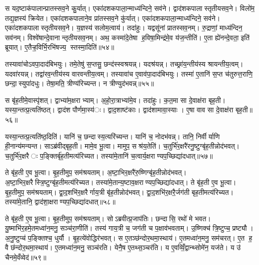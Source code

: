 स यद॒ष्टाक॑पालान्प्रातस्सव॒ने कु॒र्यात्। एका॑दशकपाला॒न्माध्य॑न्दिने॒ सव॑ने। द्वाद॑शकपालास्तृतीयसव॒ने। विलो॑म॒ तद्य॒ज्ञस्य॑ क्रियेत। एका॑दशकपालाने॒व प्रा॑तस्सव॒ने कु॑र्यात्। एका॑दशकपाला॒न्माध्य॑न्दिने॒ सव॑ने। एका॑दशकपालास्तृतीयसव॒ने। य॒ज्ञस्य॑ सलोम॒त्वाय॑। तदा॑हुः। यद्वसू॑नां प्रातस्सव॒नम्। रु॒द्राणां॒ माध्य॑न्दिन॒ सव॑नम्। विश्वे॑षान्दे॒वानान्तृतीयसव॒नम्। अथ॒ कस्मा॑दे॒तेषा ह॒विषा॒मिन्द्र॑मे॒व य॑ज॒न्तीति॑। ए॒ता ह्ये॑नन्दे॒वता॒ इति॑ ब्रूयात्। ए॒तैऱ्ह॒विर्भि॒रभि॑षज्य॒ स्तस्मा॒दिति॑॥५४॥


तस्यावा॑चोऽवपा॒दाद॑बिभयुः। तमे॒तेषु॑ स॒प्तसु॒ छन्द॑स्स्वश्रयन्न्। यदश्र॑यन्न्। तच्छ्रा॑य॒न्तीय॑स्य श्रायन्तीय॒त्वम्। यदवा॑रयन्न्। तद्वा॑रव॒न्तीय॑स्य वारवन्तीय॒त्वम्। तस्यावा॑च ए॒वाव॑पा॒दाद॑बिभयुः। तस्मा॑ ए॒तानि॑ स॒प्त च॑तुरुत्त॒राणि॒ छन्दा॒स्युपा॑दधुः। तेषा॒मति॒ त्रीण्य॑रिच्यन्त। न त्रीण्युद॑भवन्न्॥५५॥

स बृ॑ह॒तीमे॒वास्पृ॑शत्। द्वाभ्या॑म॒क्षराभ्याम्। अ॒हो॒रा॒त्राभ्या॑मे॒व। तदा॑हुः। क॒त॒मा सा दे॒वाक्ष॑रा बृह॒ती। यस्या॒न्तत्प्र॒त्यति॑ष्ठत्। द्वाद॑श पौर्णमा॒स्य॑ः। द्वाद॒शाष्ट॑काः। द्वाद॑शामावा॒स्याः। ए॒षा वाव सा दे॒वाक्ष॑रा बृह॒ती॥५६॥

यस्या॒न्तत्प्र॒त्यति॑ष्ठ॒दिति॑। यानि॑ च॒ छन्दास्य॒त्यरि॑च्यन्त। यानि॑ च॒ नोदभ॑वन्न्। तानि॒ निर्वीर्याणि ही॒नान्य॑मन्यन्त। साऽब्र॑वीद्बृह॒ती। मामे॒व भू॒त्वा। मामुप॒ सश्र॑य॒तेति॑। च॒तुर्भि॑र॒क्षरै॑रनु॒ष्टुग्बृ॑ह॒तीन्नोद॑भवत्। च॒तुर्भि॑र॒क्षरैः प॒ङ्क्तिर्बृ॑ह॒तीमत्य॑रिच्यत। तस्या॑मे॒तानि॑ च॒त्वार्य॒क्षराण्यप॒च्छिद्या॑दधात्॥५७॥

ते बृ॑ह॒ती ए॒व भू॒त्वा। बृ॒ह॒तीमुप॒ सम॑श्रयताम्। अ॒ष्टा॒भिर॒क्षरै॑रु॒ष्णिग्बृ॑ह॒तीन्नोद॑भवत्। अ॒ष्टा॒भिर॒क्षरैस्त्रि॒ष्टुग्बृ॑ह॒तीमत्य॑रिच्यत। तस्या॑मे॒तान्य॒ष्टाव॒क्षराण्यप॒च्छिद्या॑दधात्। ते बृ॑ह॒ती ए॒व भू॒त्वा। बृ॒ह॒तीमुप॒ सम॑श्रयताम्। द्वा॒द॒शभि॑र॒क्षरैर्गाय॒त्री बृ॑ह॒तीन्नोद॑भवत्। द्वा॒द॒शभि॑र॒क्षरै॒र्जग॑ती बृह॒तीमत्य॑रिच्यत। तस्या॑मे॒तानि॒ द्वाद॑शा॒क्षराण्यप॒च्छिद्या॑दधात्॥५८॥

ते बृ॑ह॒ती ए॒व भू॒त्वा। बृ॒ह॒तीमुप॒ सम॑श्रयताम्। सोऽब्रवीत्प्र॒जाप॑तिः। छन्दासि॒ रथो॑ मे भवत। यु॒ष्माभि॑र॒हमे॒तमध्वा॑न॒मनु॒ सञ्च॑रा॒णीति॑। तस्य॑ गाय॒त्री च॒ जग॑ती च प॒क्षाव॑भवताम्। उ॒ष्णिक्च॑ त्रि॒ष्टुप्च॒ प्रष्ट्यौ। अ॒नु॒ष्टुप्च॑ प॒ङ्क्तिश्च॒ धुर्यौ। बृ॒ह॒त्ये॑वोद्धिर॑भवत्। स ए॒तञ्छ॑न्दोर॒थमा॒स्थाय॑। ए॒तमध्वा॑न॒मनु॒ सम॑चरत्। ए॒त ह॒ वै छ॑न्दोर॒थमा॒स्थाय॑। ए॒तमध्वा॑न॒मनु॒ सञ्च॑रति। येनै॒ष ए॒तथ्स॒ञ्चर॑ति। य ए॒वव्विँ॒द्वान्थ्सोमे॑न॒ यज॑ते। य उ॑ चैनमे॒वँव्वेद॑॥५९॥


